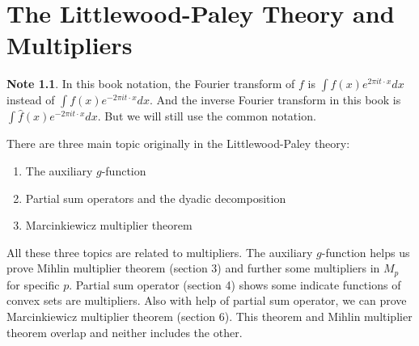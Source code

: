 \documentclass{report}
\theoremstyle{definition}
\newtheorem{note}{Note}
\theoremstyle{definition}
\theoremstyle{plain}
\numberwithin{theorem}{section}
\numberwithin{remark}{section}
\numberwithin{equation}{section}
\begin{document}
\chapter{The Littlewood-Paley Theory and Multipliers}
\begin{note}
    In this book notation, the Fourier transform of $f$ is $\int f(x)e^{2\pi i t\cdot x} dx$ instead of $\int f(x)e^{-2\pi i t\cdot x} dx$. And the inverse Fourier transform in this book is $\int \hat{f}(x)e^{-2\pi i t\cdot x} dx$. But we will still use the common notation.
\end{note}
There are three main topic originally in the Littlewood-Paley theory:
\begin{enumerate}
    \item The auxiliary $g$-function
    \item Partial sum operators and the dyadic decomposition
    \item Marcinkiewicz multiplier theorem
\end{enumerate}
All these three topics are related to multipliers. The auxiliary $g$-function helps us prove Mihlin multiplier theorem (section 3) and further some multipliers in $M_p$ for specific $p$. Partial sum operator (section 4) shows some indicate functions of convex sets are multipliers. Also with help of partial sum operator, we can prove Marcinkiewicz multiplier theorem (section 6). This theorem and Mihlin multiplier theorem overlap and neither includes the other.
\end{document}
